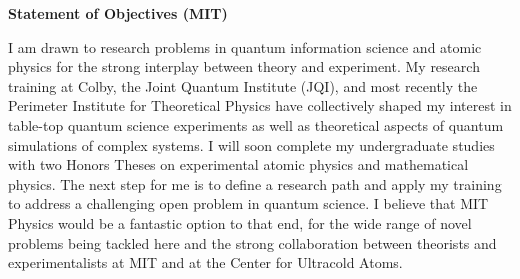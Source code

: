 \documentclass[12pt]{article}
\begin{document}
	
	
\begin{center}
	\textbf{Statement of Objectives (MIT)}
\end{center}\vspace{-5pt}	
I am drawn to research problems in quantum information science and atomic physics for the strong interplay between theory and experiment. My research training at Colby, the Joint Quantum Institute (JQI), and most recently the Perimeter Institute for Theoretical Physics have collectively shaped my interest in table-top quantum science experiments as well as theoretical aspects of quantum simulations of complex systems. I will soon complete my undergraduate studies with two Honors Theses on experimental atomic physics and mathematical physics. The next step for me is to define a research path and apply my training to address a challenging open problem in quantum science. I believe that MIT Physics would be a fantastic option to that end, for the wide range of novel problems being tackled here and the strong collaboration between theorists and experimentalists at MIT and at the Center for Ultracold Atoms.    \\ \vspace{-9pt}
\end{document}
